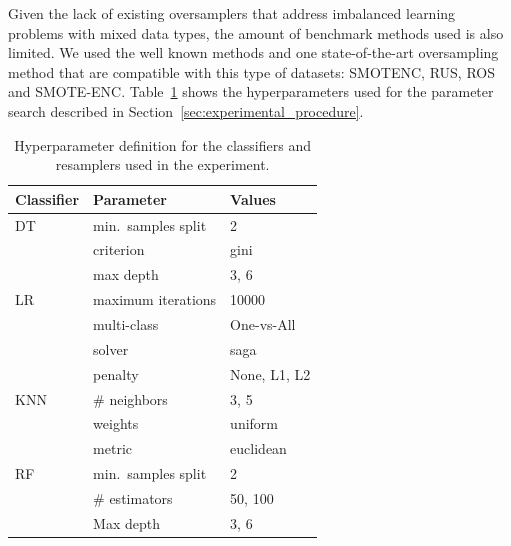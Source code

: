 \documentclass[parskip=full]{scrartcl}
\begin{document}
Given the lack of existing oversamplers that address imbalanced learning
problems with mixed data types, the amount of benchmark methods used is also
limited. We used the well known methods and one state-of-the-art oversampling
method that are compatible with this type of datasets: SMOTENC, RUS, ROS and
SMOTE-ENC.  Table~\ref{tbl:grid} shows the hyperparameters used for the
parameter search described in Section~\ref{sec:experimental_procedure}.

\begin{table}
	\centering
    \caption{\label{tbl:grid}
        Hyperparameter definition for the classifiers and resamplers used in
        the experiment.
    }
	\begin{tabular}{lll}
		\toprule
		Classifier      & Parameter                        & Values                         \\
		\midrule
        DT              & min.\ samples split              & 2                              \\
                        & criterion                        & gini                           \\
                        & max depth                        & 3, 6                           \\
		LR              & maximum iterations               & 10000                          \\
                        & multi-class                      & One-vs-All                     \\
		                & solver                           & saga                           \\
                        & penalty                          & None, L1, L2                   \\
		KNN             & \# neighbors                     & 3, 5                           \\
                        & weights                          & uniform                        \\
                        & metric                           & euclidean                      \\
		RF              & min.\ samples split              & 2                              \\
		                & \# estimators                    & 50, 100                        \\
		                & Max depth                        & 3, 6                           \\

\end{tabular}
\end{table}
\end{document}
